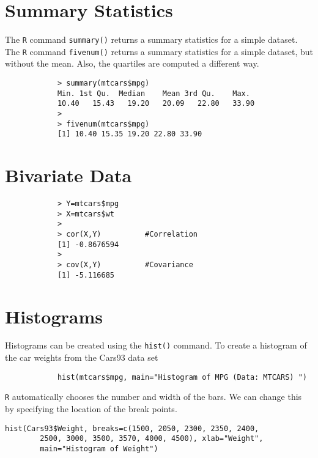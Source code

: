 \documentclass[a4paper,12pt]{article}
\begin{document}
\begin{itemize}
		
		\section{Summary Statistics}
		The \texttt{R} command \texttt{summary()} returns a summary statistics for a simple dataset.
		The \texttt{R} command \texttt{fivenum()} returns a summary statistics for a simple dataset, but without the mean.
		Also, the quartiles are computed a different way.
		
		\large
		\begin{framed}
			\begin{verbatim}
			> summary(mtcars$mpg)
			Min. 1st Qu.  Median    Mean 3rd Qu.    Max.
			10.40   15.43   19.20   20.09   22.80   33.90 
			>
			> fivenum(mtcars$mpg)
			[1] 10.40 15.35 19.20 22.80 33.90
			\end{verbatim}
		\end{framed}
		\large
		
		
		
		
		\section{Bivariate Data}
		\large \begin{framed}
			\begin{verbatim}
			> Y=mtcars$mpg
			> X=mtcars$wt
			>
			> cor(X,Y)          #Correlation
			[1] -0.8676594
			>
			> cov(X,Y)          #Covariance
			[1] -5.116685
			\end{verbatim}
		\end{framed}\large
		
		
		\section{Histograms}
		Histograms can be created using the \texttt{hist()} command.
		To create a histogram of the car weights from the Cars93 data set
		\large
		\begin{framed}
			\begin{verbatim}
			hist(mtcars$mpg, main="Histogram of MPG (Data: MTCARS) ")
			\end{verbatim}
		\end{framed}\large
		\texttt{R} automatically chooses the number and width of the bars. We can
		change this by specifying the location of the break points.
		\large
		
		\begin{verbatim}hist(Cars93$Weight, breaks=c(1500, 2050, 2300, 2350, 2400,
		2500, 3000, 3500, 3570, 4000, 4500), xlab="Weight",
		main="Histogram of Weight")
		\end{verbatim}
		

\end{itemize}
\end{document}
